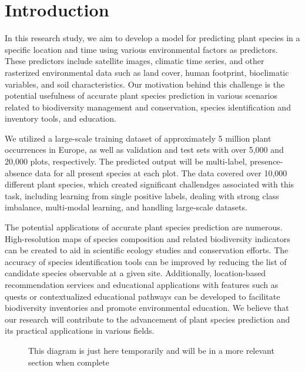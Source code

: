 \section{Introduction}

In this research study, we aim to develop a model for predicting plant species in a specific location and time using various environmental factors as predictors. These predictors include satellite images, climatic time series, and other rasterized environmental data such as land cover, human footprint, bioclimatic variables, and soil characteristics. Our motivation behind this challenge is the potential usefulness of accurate plant species prediction in various scenarios related to biodiversity management and conservation, species identification and inventory tools, and education.

We utilized a large-scale training dataset of approximately 5 million plant occurrences in Europe, as well as validation and test sets with over 5,000 and 20,000 plots, respectively. The predicted output will be multi-label, presence-absence data for all present species at each plot. The data covered over 10,000 different plant species, which created significant challendges associated with this task, including learning from single positive labels, dealing with strong class imbalance, multi-modal learning, and handling large-scale datasets.

The potential applications of accurate plant species prediction are numerous. High-resolution maps of species composition and related biodiversity indicators can be created to aid in scientific ecology studies and conservation efforts. The accuracy of species identification tools can be improved by reducing the list of candidate species observable at a given site. Additionally, location-based recommendation services and educational applications with features such as quests or contextualized educational pathways can be developed to facilitate biodiversity inventories and promote environmental education. We believe that our research will contribute to the advancement of plant species prediction and its practical applications in various fields.

\begin{figure}
    \begin{center}
        
        \caption{This diagram is just here temporarily and will be in a more relevant section when complete}
    \end{center}
\end{figure}
